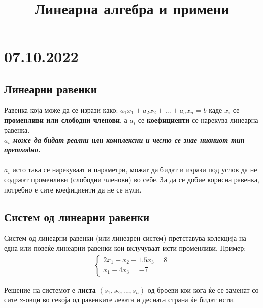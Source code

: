 \documentclass[12pt,a4paper]{article}
\begin{document}
	
	\title{Линеарна алгебра и примени}
	\author{}
	\date{}
	\maketitle
	
	\section{07.10.2022}
	\subsection{Линеарни равенки}
		Равенка која може да се изрази како: $a_{1}x_{1}+a_{2}x_{2}+...+a_{a}x_{n}=b$ каде $x_i$ се \textbf{променливи или слободни членови}, а $a_i$ се \textbf{коефициенти} се нарекува линеарна равенка.
		\\ 
		\textit{\textbf{$a_i$ може да бидат реални или комплексни и често се знае нивниот тип претходно.}}
		\\ \\
		$a_i$ исто така се нарекуваат и параметри, можат да бидат и изрази под услов да не содржат променливи (слободни членови) во себе. За да се добие корисна равенка, потребно е сите коефициенти да не се нули.
		
	
	\subsection{Систем од линеарни равенки}
		Систем од линеарни равенки (или линеарен систем) претставува колекција на една или повеќе линеарни равенки кои вклучуваат исти променливи.
		Пример:
		\begin{align}
			\begin{cases}
				2x_1 - x_2 + 1.5x_3 = 8 \\
				x_1 - 4x_3 = -7
			\end{cases}
		\end{align}
		
		Решение на системот е \textbf{листа} $(s_1, s_2, ..., s_n)$ од броеви кои кога ќе се заменат со сите x-овци во секоја од равенките левата и десната страна ќе бидат исти.
		
\end{document}
